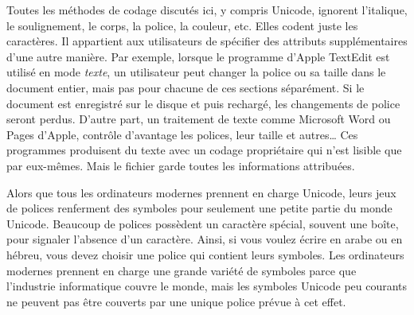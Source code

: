 \documentclass[11pt,french]{article}
\newcommand{\cmd}[1]{\textsf{#1}}
\begin{document}
Toutes les méthodes de codage discutés ici, y compris \cmd{Unicode}, ignorent l'italique, le soulignement, le corps, la police, la couleur, etc. Elles codent juste les caractères. Il appartient aux utilisateurs de spécifier des attributs supplémentaires d'une autre manière. Par exemple, lorsque le programme d'Apple \cmd{TextEdit} est utilisé en mode \emph{texte}, un utilisateur peut changer la police ou sa taille dans le document entier, mais pas pour chacune de ces sections séparément. Si le document est enregistré sur le disque et puis rechargé, les changements de police seront perdus. D'autre part, un traitement de texte comme Microsoft Word ou Pages d'Apple, contrôle d'avantage les polices, leur taille et autres… Ces programmes produisent du texte avec un codage propriétaire qui n'est lisible que par eux-mêmes. Mais le fichier garde toutes les informations attribuées. 

Alors que tous les ordinateurs modernes prennent en charge \cmd{Unicode}, leurs jeux de polices renferment des symboles pour seulement une petite partie du monde Unicode. Beaucoup de polices possèdent un caractère spécial, souvent une boîte, pour signaler l'absence d'un caractère. Ainsi, si vous voulez écrire en arabe ou en hébreu, vous devez choisir une police qui contient leurs symboles. Les ordinateurs modernes prennent en charge une grande variété de symboles parce que l'industrie informatique couvre le monde, mais les symboles Unicode peu courants ne peuvent pas être couverts par une unique police prévue à cet effet.
\end{document}

